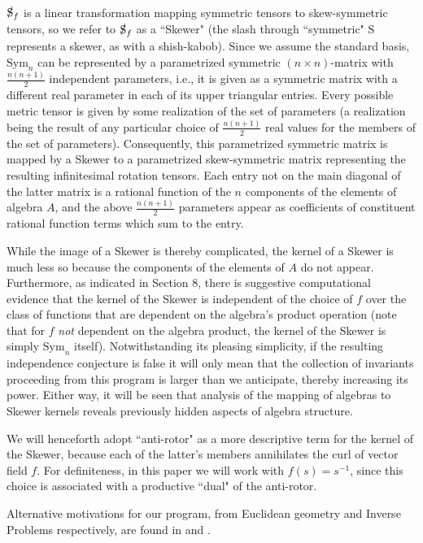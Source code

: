 \documentclass{amsart}
\theoremstyle{definition}
\numberwithin{theorem}{section}
\numberwithin{equation}{section}
\begin{document}
$\slashed{\text{S}}_f$ is a linear transformation mapping symmetric tensors to skew-symmetric tensors, so we refer to $\slashed{\text{S}}_f$ as a ``Skewer" (the slash through ``symmetric" S represents a skewer, as with a shish-kabob). Since we assume the standard basis, $\text{Sym}_n$ can be represented by a parametrized symmetric $(n\times n)$-matrix with $\frac{n(n+1)}{2}$ independent parameters, i.e., it is given as a symmetric matrix with a different real parameter in each of its upper triangular entries.  Every possible metric tensor is given by some realization of the set of parameters (a realization being the result of any particular choice of $\frac{n(n+1)}{2}$ real values for the members of the set of parameters).  Consequently, this parametrized symmetric matrix is mapped by a Skewer to a parametrized skew-symmetric matrix representing the resulting infinitesimal rotation tensors.  Each entry not on the main diagonal of the latter matrix is a rational function of the $n$ components of the elements of algebra $A$, and the above $\frac{n(n+1)}{2}$ parameters appear as coefficients of constituent rational function terms which sum to the entry.  

While the image of a Skewer is thereby complicated, the kernel of a Skewer is much less so because the components of the elements of $A$ do not appear.  Furthermore, as indicated in Section 8, there is suggestive computational evidence that the kernel of the Skewer is independent of the choice of $f$ over the class of functions that are dependent on the algebra's product operation (note that for $f$ {\it not} dependent on the algebra product, the kernel of the Skewer is simply $\text{Sym}_n$ itself).  Notwithstanding its pleasing simplicity, if the resulting independence conjecture is false it will only mean that the  collection of invariants proceeding from this program is larger than we anticipate, thereby increasing its power.  Either way, it will be seen that analysis of the mapping of algebras to Skewer kernels reveals previously hidden aspects of algebra structure.

We will henceforth adopt ``anti-rotor" as a more descriptive term for the kernel of the Skewer, because each of the latter's members annihilates the curl of vector field $f$.  
For definiteness, in this paper we will work with $f(s)=s^{-1}$, since this choice is associated with a productive ``dual" of the anti-rotor.

Alternative motivations for our program, from Euclidean geometry and Inverse Problems respectively, are found in \cite{fgreensite:2025b} and \cite{fgreensite:2025c}.
\end{document}
